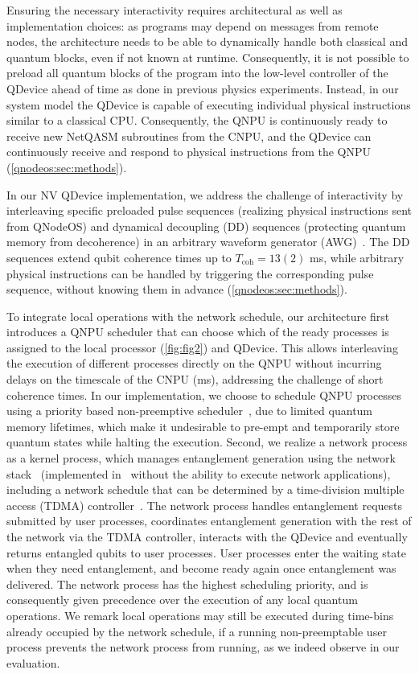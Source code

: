 Ensuring the necessary interactivity requires architectural as well as implementation choices: as programs may depend on messages from remote nodes, the architecture needs to be able to dynamically handle both classical and quantum blocks, even if not known at runtime. Consequently, it is not possible to preload all quantum blocks of the program into the low-level controller of the QDevice ahead of time as done in previous physics experiments. Instead, in our system model the QDevice is capable of executing individual physical instructions similar to a classical CPU. Consequently, the QNPU is continuously ready to receive new NetQASM subroutines from the CNPU, and the QDevice can continuously receive and respond to physical instructions from the QNPU (\cref{qnodeos:sec:methods}).

In our NV QDevice implementation, we address the challenge of interactivity by interleaving specific preloaded pulse sequences (realizing physical instructions sent from QNodeOS) and dynamical decoupling (DD) sequences (protecting quantum memory from decoherence) in an arbitrary waveform generator (AWG)~\cite{zurich_instruments_hdawg_2019}. The DD sequences extend qubit coherence times up to $T_{\text{coh}} = 13(2)$ ms, while arbitrary physical instructions can be handled by triggering the corresponding pulse sequence, without knowing them in advance (\cref{qnodeos:sec:methods}).

To integrate local operations with the network schedule, our architecture first introduces a QNPU scheduler that can choose which of the ready processes is assigned to the local processor (\cref{fig:fig2}) and QDevice. This allows interleaving the execution of different processes directly on the QNPU without incurring delays on the timescale of the CNPU (ms), addressing the challenge of short coherence times. In our implementation, we choose to schedule QNPU processes using a priority based non-preemptive scheduler~\cite{liu_1973_scheduling}, due to limited quantum memory lifetimes, which make it undesirable to pre-empt and temporarily store quantum states while halting the execution. Second, we realize a network process as a kernel process, which manages entanglement generation using the network stack~\cite{dahlberg_2019_egp,kozlowski_2020_qnp} (implemented in~\cite{pompili_2022_experimental} without the ability to execute network applications), including a network schedule that can be determined by a time-division multiple access (TDMA) controller~\cite{skrzypczyk_2021_arch}. The network process handles entanglement requests submitted by user processes, coordinates entanglement generation with the rest of the network via the TDMA controller, interacts with the QDevice and eventually returns entangled qubits to user processes. User processes enter the waiting state when they need entanglement, and become ready again once entanglement was delivered. The network process has the highest scheduling priority, and is consequently given precedence over the execution of any local quantum operations. We remark local operations may still be executed during time-bins already occupied by the network schedule, if a running non-preemptable user process prevents the network process from running, as we indeed observe in our evaluation.

